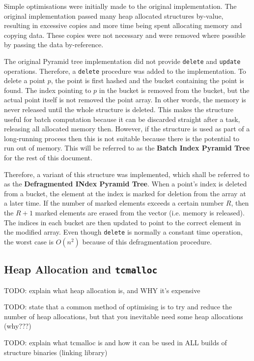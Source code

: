 Simple optimisations were initially made to the original implementation. The original implementation passed many heap allocated structures by-value, resulting in excessive copies and more time being spent allocating memory and copying data. These copies were not necessary and were removed where possible by passing the data by-reference.

The original Pyramid tree implementation did not provide \texttt{delete} and \texttt{update} operations. Therefore, a \texttt{delete} procedure was added to the implementation. To delete a point $p$, the point is first hashed and the bucket containing the point is found. The index pointing to $p$ in the bucket is removed from the bucket, but the actual point itself is not removed the point array. In other words, the memory is never released until the whole structure is deleted. This makes the structure useful for batch computation because it can be discarded straight after a task, releasing all allocated memory then. However, if the structure is used as part of a long-running process then this is not suitable because there is the potential to run out of memory. This will be referred to as the \textbf{Batch Index Pyramid Tree} for the rest of this document.

Therefore, a variant of this structure was implemented, which shall be referred to as the \textbf{Defragmented INdex Pyramid Tree}. When a point's index is deleted from a bucket, the element at the index is marked for deletion from the array at a later time. If the number of marked elements exceeds a certain number $R$, then the $R + 1$ marked elements are erased from the vector (i.e. memory is released). The indices in each bucket are then updated to point to the correct element in the modified array. Even though \texttt{delete} is normally a constant time operation, the worst case is $O(n^2)$ because of this defragmentation procedure.

\subsection{Heap Allocation and \texttt{tcmalloc}}

TODO: explain what heap allocation is, and WHY it's expensive

TODO: state that a common method of optimising is to try and reduce the number of heap allocations, but that you inevitable need some heap allocations (why???)

TODO: explain what tcmalloc is and how it can be used in ALL builds of structure binaries (linking library)

